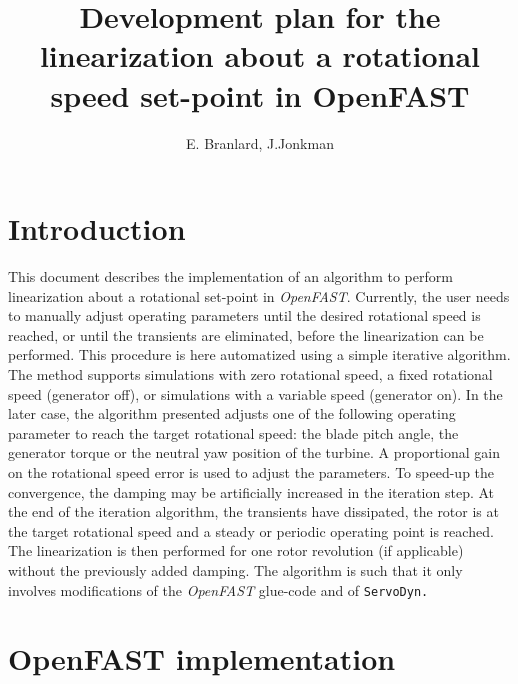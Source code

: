 \documentclass[11pt]{article}
\begin{document}
\title{Development plan for the linearization about a rotational speed set-point in OpenFAST}
\author{E. Branlard, J.Jonkman}
\maketitle

\section*{Introduction}
This document describes the implementation of an algorithm to perform %
linearization about a rotational set-point in \textit{OpenFAST}. Currently, the user needs to manually adjust operating parameters until the desired rotational speed is reached, or until the transients are eliminated, before the linearization can be performed. This procedure is here automatized using a simple iterative algorithm. The method supports simulations with zero rotational speed, a fixed rotational speed (generator off), or simulations with a variable speed (generator on). In the later case, the algorithm presented adjusts one of the following operating parameter to reach the target rotational speed: the blade pitch angle, the generator torque or the neutral yaw position of the turbine. A proportional gain on the rotational speed error is used to adjust the parameters. To speed-up the convergence, the damping may be artificially increased in the iteration step. At the end of the iteration algorithm, the transients have dissipated, the rotor is at the target rotational speed and a steady or periodic operating point is reached. The linearization is then performed for one rotor revolution (if applicable) without the previously added damping.
The algorithm is such that it only involves modifications of the \textit{OpenFAST} glue-code and of \tt{ServoDyn}.


\section{OpenFAST implementation}
\end{document}
